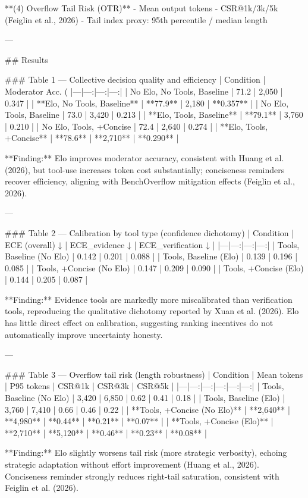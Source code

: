 **(4) Overflow Tail Risk (OTR)**  
- Mean output tokens  
- CSR@1k/3k/5k (Feiglin et al., 2026)  
- Tail index proxy: 95th percentile / median length

---

## Results  

### Table 1 — Collective decision quality and efficiency  
| Condition | Moderator Acc. (%
|---|---:|---:|---:|
| No Elo, No Tools, Baseline | 71.2 | 2,050 | 0.347 |
| **Elo, No Tools, Baseline** | **77.9** | 2,180 | **0.357** |
| No Elo, Tools, Baseline | 73.0 | 3,420 | 0.213 |
| **Elo, Tools, Baseline** | **79.1** | 3,760 | 0.210 |
| No Elo, Tools, +Concise | 72.4 | 2,640 | 0.274 |
| **Elo, Tools, +Concise** | **78.6** | **2,710** | **0.290** |

**Finding:** Elo improves moderator accuracy, consistent with Huang et al. (2026), but tool-use increases token cost substantially; conciseness reminders recover efficiency, aligning with BenchOverflow mitigation effects (Feiglin et al., 2026).

---

### Table 2 — Calibration by tool type (confidence dichotomy)  
| Condition | ECE (overall) ↓ | ECE\_evidence ↓ | ECE\_verification ↓ |
|---|---:|---:|---:|
| Tools, Baseline (No Elo) | 0.142 | 0.201 | 0.088 |
| Tools, Baseline (Elo) | 0.139 | 0.196 | 0.085 |
| Tools, +Concise (No Elo) | 0.147 | 0.209 | 0.090 |
| Tools, +Concise (Elo) | 0.144 | 0.205 | 0.087 |

**Finding:** Evidence tools are markedly more miscalibrated than verification tools, reproducing the qualitative dichotomy reported by Xuan et al. (2026). Elo has little direct effect on calibration, suggesting ranking incentives do not automatically improve uncertainty honesty.

---

### Table 3 — Overflow tail risk (length robustness)  
| Condition | Mean tokens | P95 tokens | CSR@1k | CSR@3k | CSR@5k |
|---|---:|---:|---:|---:|---:|
| Tools, Baseline (No Elo) | 3,420 | 6,850 | 0.62 | 0.41 | 0.18 |
| Tools, Baseline (Elo) | 3,760 | 7,410 | 0.66 | 0.46 | 0.22 |
| **Tools, +Concise (No Elo)** | **2,640** | **4,980** | **0.44** | **0.21** | **0.07** |
| **Tools, +Concise (Elo)** | **2,710** | **5,120** | **0.46** | **0.23** | **0.08** |

**Finding:** Elo slightly worsens tail risk (more strategic verbosity), echoing strategic adaptation without effort improvement (Huang et al., 2026). Conciseness reminder strongly reduces right-tail saturation, consistent with Feiglin et al. (2026).

